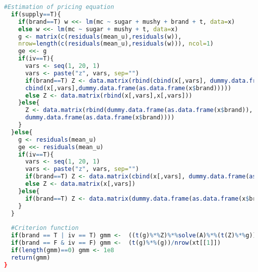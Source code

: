 \documentclass[12pt,english]{article}
\begin{document}
\begin{scriptsize}
\begin{lstlisting}[language=R]
  #Estimation of pricing equation
  if(supply==T){
    if(brand==T) w <<- lm(mc ~ sugar + mushy + brand + t, data=x) 
    else w <<- lm(mc ~ sugar + mushy + t, data=x)
    g <- matrix(c(residuals(mean_u),residuals(w)), 
    nrow=length(c(residuals(mean_u),residuals(w))), ncol=1)
    ge <<- g
    if(iv==T){
      vars <- seq(1, 20, 1)
      vars <- paste("z", vars, sep="")  
      if(brand==T) Z <- data.matrix(rbind(cbind(x[,vars], dummy.data.frame(as.data.frame(x$brand))),
      cbind(x[,vars],dummy.data.frame(as.data.frame(x$brand))))) 
      else Z <- data.matrix(rbind(x[,vars],x[,vars]))      
    }else{
      Z <- data.matrix(rbind(dummy.data.frame(as.data.frame(x$brand)),
      dummy.data.frame(as.data.frame(x$brand))))    
    }    
  }else{
    g <- residuals(mean_u)
    ge <<- residuals(mean_u)
    if(iv==T){
      vars <- seq(1, 20, 1)
      vars <- paste("z", vars, sep="")  
      if(brand==T) Z <- data.matrix(cbind(x[,vars], dummy.data.frame(as.data.frame(x$brand)))) 
      else Z <- data.matrix(x[,vars])
    }else{
      if(brand==T) Z <- data.matrix(dummy.data.frame(as.data.frame(x$brand)))
    }
  }
  
  #Criterion function
  if(brand == T | iv == T) gmm <-  ((t(g)%*%Z)%*%solve(A)%*%(t(Z)%*%g))/nrow(xt[[1]])
  if(brand == F & iv == F) gmm <-  (t(g)%*%(g))/nrow(xt[[1]])
  if(length(gmm)==0) gmm <- 1e8
  return(gmm)    
}
\end{lstlisting}
\end{scriptsize}
\end{document}
